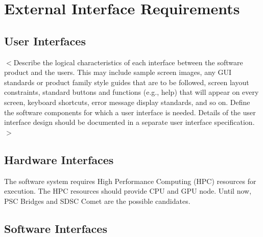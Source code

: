 \documentclass{scrreprt}
\begin{document}
\chapter{External Interface Requirements}

\section{User Interfaces}
$<$Describe the logical characteristics of each interface between the software 
product and the users. This may include sample screen images, any GUI standards 
or product family style guides that are to be followed, screen layout 
constraints, standard buttons and functions (e.g., help) that will appear on 
every screen, keyboard shortcuts, error message display standards, and so on.  
Define the software components for which a user interface is needed. Details of 
the user interface design should be documented in a separate user interface 
specification.$>$

\section{Hardware Interfaces}

The software system requires High Performance Computing (HPC) resources for execution.
The HPC resources should provide CPU and GPU node. Until now, PSC Bridges and SDSC Comet
are the possible candidates.

\section{Software Interfaces}

\end{document}
